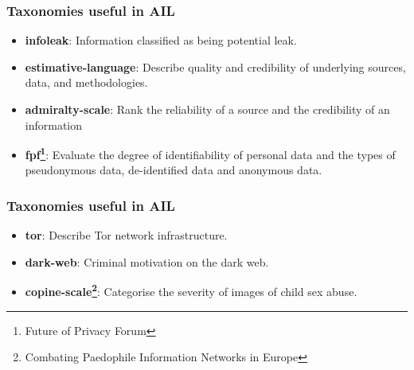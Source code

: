 \documentclass{beamer}
\begin{document}
\begin{frame}
    \frametitle{Taxonomies useful in AIL}
        \begin{itemize}
            \item {\bf infoleak}: Information classified as being potential leak.
            \item {\bf estimative-language}: Describe quality and credibility of underlying sources, data, and methodologies.
            \item {\bf admiralty-scale}: Rank the reliability of a source and the credibility of an information
            \item {\bf fpf\footnote{Future of Privacy Forum}}: Evaluate the degree of identifiability of personal data and the types of pseudonymous data, de-identified data and anonymous data.
        \end{itemize}
\end{frame}

\begin{frame}
    \frametitle{Taxonomies useful in AIL}
        \begin{itemize}
            \item {\bf tor}: Describe Tor network infrastructure.
            \item {\bf dark-web}: Criminal motivation on the dark web.
            \item {\bf copine-scale\footnote{Combating Paedophile Information Networks in Europe}}: Categorise the severity of images of child sex abuse.
        \end{itemize}
\end{frame}

\end{document}

